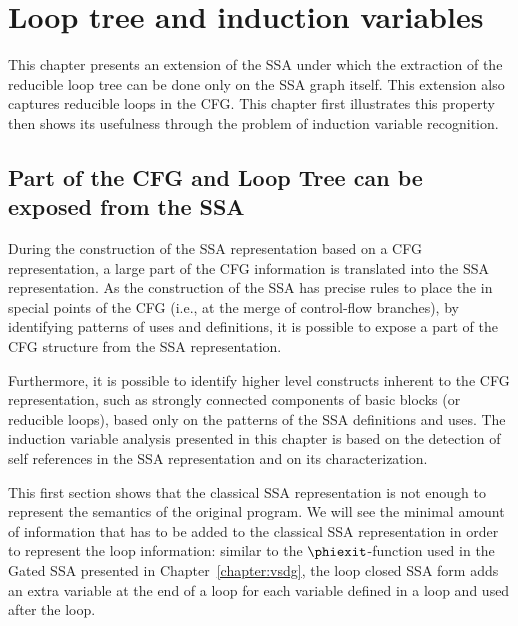 {
\LinesNumberedHidden
  \def\bb#1{$\textit{bb}_{#1}$}

\chapter{Loop tree and induction variables }
\label{chapter:loop_tree}


\providecommand{\SSA}{SSA}
\providecommand{\CFG}{CFG}
\providecommand{\loopphi}{loop-$\phi$}
\providecommand{\closephi}{close-$\phi$}
\providecommand{\CHREC}[1]{\{#1\}}

This chapter presents an extension of the \SSA{} under which the extraction of the reducible loop tree can be done only on the \SSA{} graph itself. 
This extension also captures reducible loops in the CFG. 
This chapter first illustrates this property then shows its usefulness through the problem of induction variable recognition.

\section{Part of the \CFG{} and Loop Tree can be exposed from the \SSA{}}

During the construction of the \SSA{} representation based on a \CFG{} representation, a large part of the \CFG{} information is translated into the \SSA{} representation. 
As the construction of the \SSA{} has precise rules to place the \phinodes in special points of the \CFG{} (i.e., at the merge of control-flow branches), by identifying patterns of uses and definitions, it is possible to expose a part of the \CFG{} structure from the \SSA{} representation.

Furthermore, it is possible to identify higher level constructs inherent to the \CFG{} representation, such as strongly connected components of basic blocks (or reducible loops), based only on the patterns of the \SSA{} definitions and uses. 
The induction variable analysis presented in this chapter is based on the detection of self references in the \SSA{} representation and on its characterization.

This first section shows that the classical \SSA{} representation is not enough to represent the semantics of the original program. 
We will see the minimal amount of information that has to be added to the classical \SSA{} representation in order to represent the loop information: 
similar to the $\phiexit$-function used in the Gated \SSA{} presented in Chapter~\ref{chapter:vsdg}, the loop closed \SSA{} form adds an extra variable at the end of a loop for each variable defined in a loop and used after the loop.

}
